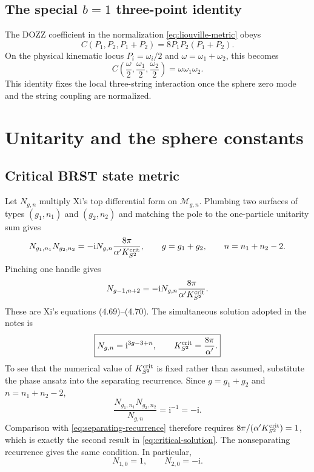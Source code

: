 \documentclass[11pt]{article}
\numberwithin{equation}{section}
\newcommand{\A}{\alpha'}
\newcommand{\ii}{\mathrm i}
\newcommand{\cM}{\mathcal M}
\begin{document}
\subsection{The special \texorpdfstring{$b=1$}{b=1} three-point identity}

The DOZZ coefficient in the normalization \eqref{eq:liouville-metric} obeys
\begin{equation}
 C(P_1,P_2,P_1+P_2)=8P_1P_2(P_1+P_2).
 \label{eq:resonance}
\end{equation}
On the physical kinematic locus $P_i=\omega_i/2$ and
$\omega=\omega_1+\omega_2$, this becomes
\begin{equation}
 C\!\left(\frac\omega2,\frac{\omega_1}{2},\frac{\omega_2}{2}\right)
 =\omega\omega_1\omega_2.
 \label{eq:energy-polynomial}
\end{equation}
This identity fixes the local three-string interaction once the sphere zero
mode and the string coupling are normalized.

\section{Unitarity and the sphere constants}

\subsection{Critical BRST state metric}

Let $N_{g,n}$ multiply Xi's top differential form on $\cM_{g,n}$.  Plumbing
two surfaces of types $(g_1,n_1)$ and $(g_2,n_2)$ and matching the pole to the
one-particle unitarity sum gives
\begin{equation}
 N_{g_1,n_1}N_{g_2,n_2}
 =-\ii N_{g,n}\frac{8\pi}{\A K_{S^2}^{\rm crit}},
 \qquad
 g=g_1+g_2,\qquad n=n_1+n_2-2.
 \label{eq:separating-recurrence}
\end{equation}
Pinching one handle gives
\begin{equation}
 N_{g-1,n+2}
 =-\ii N_{g,n}\frac{8\pi}{\A K_{S^2}^{\rm crit}}.
 \label{eq:nonseparating-recurrence}
\end{equation}
These are Xi's equations (4.69)--(4.70).  The simultaneous solution adopted in
the notes is
\begin{equation}
 \boxed{
 N_{g,n}=\ii^{3g-3+n},
 \qquad
 K_{S^2}^{\rm crit}=\frac{8\pi}{\A}.}
 \label{eq:critical-solution}
\end{equation}
To see that the numerical value of $K_{S^2}^{\rm crit}$ is fixed rather than
assumed, substitute the phase ansatz into the separating recurrence.  Since
$g=g_1+g_2$ and $n=n_1+n_2-2$,
\begin{equation}
 \frac{N_{g_1,n_1}N_{g_2,n_2}}{N_{g,n}}
 =\ii^{-1}=-\ii.
 \label{eq:N-ratio}
\end{equation}
Comparison with \eqref{eq:separating-recurrence} therefore requires
$8\pi/(\A K_{S^2}^{\rm crit})=1$, which is exactly the second result in
\eqref{eq:critical-solution}.  The nonseparating recurrence gives the same
condition.
In particular,
\begin{equation}
 N_{1,0}=1,\qquad N_{2,0}=-\ii.
 \label{eq:N10N20}
\end{equation}
\end{document}
